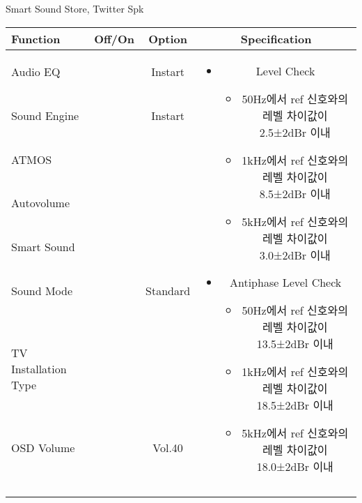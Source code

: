 \begin{frame}[t]{Smart Sound Store, Twitter Spk}
\begin{tiny}
\begin{tabular}{@{}lccc@{}}
\toprule
Function & Off/On & Option & Specification \\
\midrule
Audio EQ & \color{black}{Off} & Instart &
\multirow{10}{60mm}{
\begin{itemize}
	\item Level Check
	\begin{itemize}
		\item 50Hz에서 ref 신호와의 레벨 차이값이 2.5±2dBr 이내
		\item 1kHz에서 ref 신호와의 레벨 차이값이 8.5±2dBr 이내
		\item 5kHz에서 ref 신호와의 레벨 차이값이 3.0±2dBr 이내
	\end{itemize}
	\item Antiphase Level Check
	\begin{itemize}
		\item 50Hz에서 ref 신호와의 레벨 차이값이 13.5±2dBr 이내
		\item 1kHz에서 ref 신호와의 레벨 차이값이 18.5±2dBr 이내
		\item 5kHz에서 ref 신호와의 레벨 차이값이 18.0±2dBr 이내
	\end{itemize}
\end{itemize}
} \\
Sound Engine & \color{blue}{On} & Instart & \\
ATMOS & \color{black}{Off}  & & \\
Autovolume & \color{black}{Off} & & \\
Smart Sound & \color{blue}{On} & & \\
Sound Mode & \color{blue}{On} & Standard & \\
TV Installation Type & \color{blue}{On} & \color{black}{Standtype1} & \\
OSD Volume & \color{blue}{On} & Vol.40 & \\
& & & \\
& & & \\
& & & \\
& & & \\
\midrule
\end{tabular}
\end{tiny}

\end{frame}
